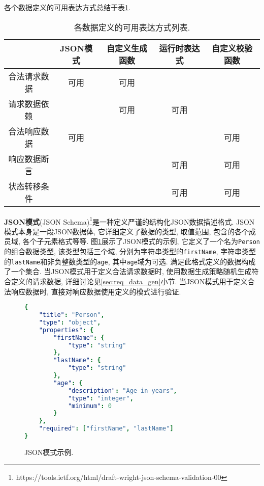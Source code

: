         各个数据定义的可用表达方式总结于表\ref{tab:data_def_format}.
        
        \begin{table}[!htb]
            \centering
            \begin{tabular}{c||c|c|c|c}
                \toprule
                 & JSON模式 & 自定义生成函数 & 运行时表达式 & 自定义校验函数 \\
                \hline
                合法请求数据 & 可用 & 可用 & & \\
                \hline
                请求数据依赖 & & 可用 & 可用 & \\ 
                \hline
                合法响应数据 & 可用 & & & 可用 \\
                \hline
                响应数据断言 & & & 可用 & 可用 \\
                \hline
                状态转移条件 & & & 可用 & 可用 \\
                \bottomrule
            \end{tabular}
            \caption{各数据定义的可用表达方式列表.}
            \label{tab:data_def_format}
        \end{table}
        
        \label{sec:set_define}
        
        \textbf{JSON模式}(JSON Schema)\footnote{https://tools.ietf.org/html/draft-wright-json-schema-validation-00}是一种定义严谨的结构化JSON数据描述格式. JSON模式本身是一段JSON数据体, 它详细定义了数据的类型, 取值范围, 包含的各个成员域, 各个子元素格式等等. 图\ref{fig:json_schema_example}展示了JSON模式的示例, 它定义了一个名为\texttt{Person}的组合数据类型, 该类型包括三个域, 分别为字符串类型的\texttt{firstName}, 字符串类型的\texttt{lastName}和非负整数类型的\texttt{age}, 其中\texttt{age}域为可选. 满足此格式定义的数据构成了一个集合. 当JSON模式用于定义合法请求数据时, 使用数据生成策略随机生成符合定义的请求数据, 详细讨论见\ref{sec:req_data_gen}小节. 当JSON模式用于定义合法响应数据时, 直接对响应数据使用定义的模式进行验证.
        \begin{figure}[!htb]
            \centering
            \scriptsize
            \tt
            
            \begin{lstlisting}[language=YAML]
{
    "title": "Person",
    "type": "object",
    "properties": {
        "firstName": {
            "type": "string"
        },
        "lastName": {
            "type": "string"
        },
        "age": {
            "description": "Age in years",
            "type": "integer",
            "minimum": 0
        }
    },
    "required": ["firstName", "lastName"]
}
            \end{lstlisting}
            
            \caption{JSON模式示例.}
            \label{fig:json_schema_example}
        \end{figure}
        
